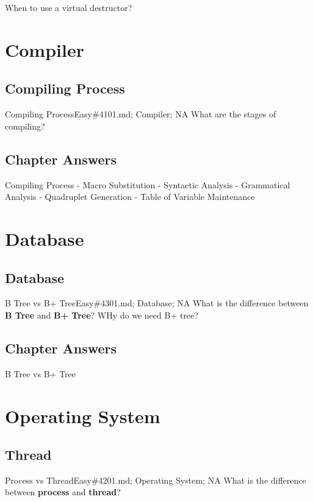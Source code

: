 \documentclass[oldfontcommands]{memoir}
\begin{document}
{\begin{answer}{When to use a virtual destructor?}
\end{answer}
\chapter{Compiler}
\minitoc
\section{Compiling Process}
\begin{question}{Compiling Process}{Easy}{\#4101.md; Compiler; NA}
What are the stages of compiling?

\end{question}

\newpage\section{Chapter Answers}\begin{answer}{Compiling Process}
- Macro Substitution
- Syntactic Analysis
- Grammatical Analysis
- Quadruplet Generation
- Table of Variable Maintenance\end{answer}
\chapter{Database}
\minitoc
\section{Database}
\begin{question}{B Tree vs B+ Tree}{Easy}{\#4301.md; Database; NA}
What is the difference between {\bf{B Tree}} and {\bf{B+ Tree}}? WHy do we need B+ tree?

\end{question}

\newpage\section{Chapter Answers}\begin{answer}{B Tree vs B+ Tree}
\end{answer}
\chapter{Operating System}
\minitoc
\section{Thread}
\begin{question}{Process vs Thread}{Easy}{\#4201.md; Operating System; NA}
What is the difference between {\bf{process}} and {\bf{thread}}?


\end{question}}
\end{document}
